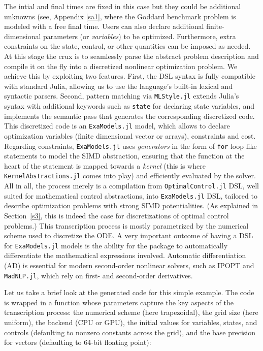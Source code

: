 The intial and final times are fixed in this case but they could be additional unknowns (see, Appendix \ref{sa1}, where the Goddard benchmark problem is modeled with a free final time. Users can also declare additional finite-dimensional parameters (or \emph{variables}) to be optimized. Furthermore, extra constraints on the state, control, or other quantities can be imposed as needed.
At this stage the crux is to seamlessly parse the abstract problem description and compile it on the fly into a discretized nonlinear optimization problem.
We achieve this by exploiting two features.
First, the DSL syntax is fully compatible with standard Julia, allowing us to use the language’s built-in lexical and syntactic parsers.
Second, pattern matching via \texttt{MLStyle.jl} \cite{MLStyle_jl} extends Julia’s syntax with additional keywords such as \verb+state+ for declaring state variables, and implements the semantic pass that generates the corresponding discretized code.
This discretized code is an \texttt{ExaModels.jl} model, which allows to declare 
optimization variables (finite dimensional vector or arrays), constraints and cost.
Regarding constraints, \texttt{ExaModels.jl} uses \emph{generators} in the form of \verb+for+ loop like statements to model the SIMD abstraction, ensuring that the function
at the heart of the statement is mapped towards a \emph{kernel} (this is where \texttt{KernelAbstractions.jl} comes into play) and efficiently evaluated by the solver. All in all, the process merely is a compilation from \texttt{OptimalControl.jl} DSL, well suited for mathematical control abstractions, into \texttt{ExaModels.jl} DSL, tailored to describe optimization problems with strong SIMD potentialities. (As explained in Section~\ref{s3}, this is indeed the case for discretizations of optimal control problems.) 
This transcription process is mostly parametrized by the numerical scheme used to discretize the ODE.
%
A very important outcome of having a DSL for \texttt{ExaModels.jl} models is the ability for the package to automatically differentiate the mathematical expressions involved.
Automatic differentiation (AD) is essential for modern second-order nonlinear solvers, such as IPOPT and \texttt{MadNLP.jl}, which rely on first- and second-order derivatives.

Let us take a brief look at the generated code for this simple example. The code is wrapped in a function whose parameters capture the key aspects of the transcription process: the numerical scheme (here trapezoidal), the grid size (here uniform), the backend (CPU or GPU), the initial values for variables, states, and controls (defaulting to nonzero constants across the grid), and the base precision for vectors (defaulting to 64-bit floating point):

